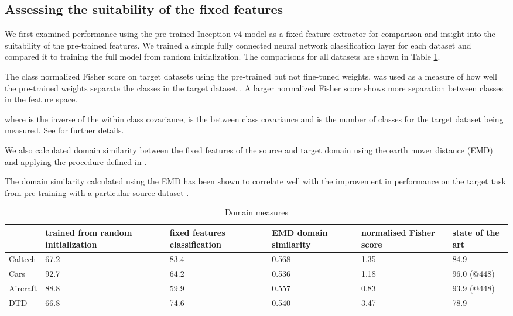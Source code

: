 \documentclass[]{article}
\begin{document}
\subsection{Assessing the suitability of the fixed features}

We first examined performance using the pre-trained Inception v4 model as a fixed
feature extractor for comparison and insight into the suitability
of the pre-trained features. We trained a simple
fully connected neural network classification layer for each dataset
and compared it to training the full model from random initialization.
The comparisons for all datasets are shown in Table \ref{domain measures}.

The class normalized Fisher score on target datasets using the pre-trained but not fine-tuned weights, was used as a measure of how well the pre-trained weights separate the classes in the target dataset \cite{fukenaga1990introduction}. A larger normalized Fisher score shows more separation between classes in the feature space.



where  is the inverse of the within class covariance,
 is the between class covariance and  is the number
of classes for the target dataset being measured. See \cite{fukenaga1990introduction} for further details.

We also calculated domain similarity between the fixed features of
the source and target domain using the earth mover distance (EMD)
\cite{rubner2000earth,peleg1989unified} and applying the procedure defined in \cite{cui2018large}.

The domain similarity calculated using the EMD has been shown to correlate well with the improvement in performance on the target task from pre-training with a particular source dataset \cite{cui2018large}.

\begin{table}[th]

\caption{Domain measures}
\label{domain measures}
\centering
\begin{tabular}{p{1.5cm}p{1.8cm}p{1.8cm}p{1.8cm}p{2cm}p{2.5cm}}
\hline 
 & {\small{}trained from random initialization} & {\small{}fixed features classification} & {\small{}EMD domain similarity} & normalised Fisher score & {\small{}state of the art}\tabularnewline
\hline 
{\small{}Caltech} & 67.2 & 83.4  & 0.568 & 1.35 & 84.9 \cite{li2019delta}\tabularnewline
{\small{}Cars} & 92.7 & 64.2 & 0.536 & 1.18 & 96.0 (@448) \cite{ridnik2020tresnet}\tabularnewline
{\small{}Aircraft} & 88.8 & 59.9 & 0.557 & 0.83 & 93.9 (@448) \cite{zhuang2020learning}\tabularnewline
{\small{}DTD} & 66.8 & 74.6 & 0.540 & 3.47 & 78.9 \cite{chen2020simple}\tabularnewline
\hline 
\end{tabular}

\end{table}
\end{document}
